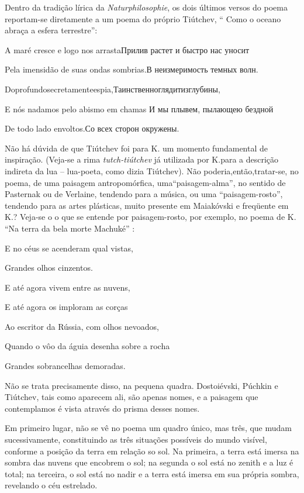 Dentro da tradição lírica da \emph{Naturphilosophie}, os dois últimos
versos do poema reportam-se diretamente a um poema do próprio Tiútchev,
`` Como o oceano abraça a esfera terrestre'':

A maré cresce e logo nos arrastaПрилив растет и быстро нас уносит

Pela imensidão de suas ondas sombrias.В неизмеримость темных волн.

Doprofundosecretamenteespia,Таинственноглядитизглубины,

E nós nadamos pelo abismo em chamas И мы плывем, пылающею бездной

De todo lado envoltos.Со всех сторон окружены.

Não há dúvida de que Tiútchev foi para K. um momento fundamental de
inspiração. (Veja-se a rima \emph{tutch-tiútchev} já utilizada por
K.para a descrição indireta da lua -- lua-poeta, como dizia Tiútchev).
Não poderia,então,tratar-se, no poema, de uma paisagem antropomórfica,
uma``paisagem-alma'', no sentido de Pasternak ou de Verlaine, tendendo
para a música, ou uma ``paisagem-rosto'', tendendo para as artes
plásticas, muito presente em Maiakóvski e freqüente em K.? Veja-se o o
que se entende por paisagem-rosto, por exemplo, no poema de K. ``Na
terra da bela morte Machuké'' :

E no céus se acenderam qual vistas,

Grandes olhos cinzentos.

E até agora vivem entre as nuvens,

E até agora os imploram as corças

Ao escritor da Rússia, com olhos nevoados,

Quando o vôo da águia desenha sobre a rocha

Grandes sobrancelhas demoradas.

Não se trata precisamente disso, na pequena quadra. Dostoiévski, Púchkin
e Tiútchev, tais como aparecem ali, são apenas nomes, e a paisagem que
contemplamos é vista através do prisma desses nomes.

Em primeiro lugar, não se vê no poema um quadro único, mas três, que
mudam sucessivamente, constituindo as três situações possíveis do mundo
visível, conforme a posição da terra em relação so sol. Na primeira, a
terra está imersa na sombra das nuvens que encobrem o sol; na segunda o
sol está no zenith e a luz é total; na terceira, o sol está no nadir e a
terra está imersa em sua própria sombra, revelando o céu estrelado.

